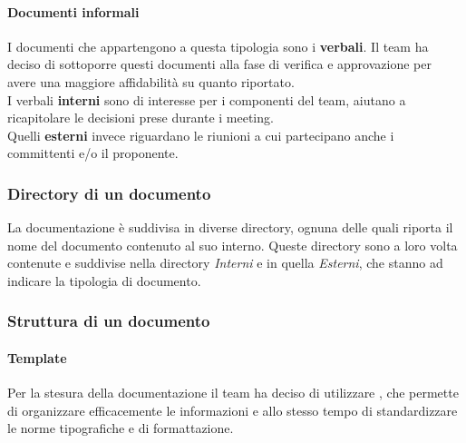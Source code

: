 \paragraph{Documenti informali}
I documenti che appartengono a questa tipologia sono i \textbf{verbali}.
Il team ha deciso di sottoporre questi documenti alla fase di verifica e approvazione per avere una maggiore affidabilità su quanto riportato.\\
I verbali \textbf{interni} sono di interesse per i componenti del team, aiutano a ricapitolare le decisioni prese durante i meeting.\\
Quelli \textbf{esterni} invece riguardano le riunioni a cui partecipano anche i committenti e/o il proponente.

\subsubsection{Directory di un documento}
La documentazione è suddivisa in diverse directory, ognuna delle quali riporta il nome del documento contenuto al suo interno. Queste directory sono a loro volta contenute e suddivise nella directory \textit{Interni} e in quella \textit{Esterni}, che stanno ad indicare la tipologia di documento.

\subsubsection{Struttura di un documento}
\paragraph{Template}
Per la stesura della documentazione il team ha deciso di utilizzare , che permette di organizzare efficacemente le informazioni e allo stesso tempo di standardizzare le norme tipografiche e di formattazione.

